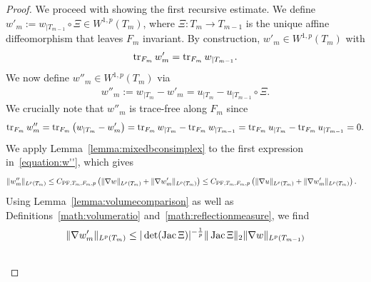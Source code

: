 \documentclass[10pt,letterpaper]{article}
\begin{document}
\begin{proof}
    We proceed with showing the first recursive estimate. 
    We define $w'_{m} := w_{|T_{m-1}} \circ \Xi \in W^{1,p}(T_{m})$,
    where $\Xi : T_{m} \rightarrow T_{m-1}$ is the unique affine diffeomorphism that leaves $F_{m}$ invariant. 
    By construction, $w'_{m} \in W^{1,p}(T_{m})$ with 
    \begin{align*}
        \operatorname{tr}_{F_{m}} w'_{m} = \operatorname{tr}_{F_{m}} w_{|T_{m-1}}
        .
    \end{align*}
    We now define $w''_{m} \in W^{1,p}(T_{m})$ via 
    \begin{align}\label{equation:w''}
        w''_{m} 
        := 
        w_{|T_{m}} - w'_{m} = u_{|T_{m}} - u_{|T_{m-1}} \circ \Xi.
    \end{align}
    We crucially note that $w''_{m}$ is trace-free along $F_{m}$ since
    \begin{align*}
        \operatorname{tr}_{F_{m}} w''_{m} 
        = 
        \operatorname{tr}_{F_{m}} \left( 
            w_{|T_{m}} - w'_{m} 
        \right) 
        =
        \operatorname{tr}_{F_{m}} w_{|T_{m}}
        -
        \operatorname{tr}_{F_{m}} w_{|T_{m-1}}
        =
        \operatorname{tr}_{F_{m}} u_{|T_{m}}
        -
        \operatorname{tr}_{F_{m}} u_{|T_{m-1}}
        = 0.
    \end{align*}
    We apply Lemma~\ref{lemma:mixedbconsimplex} to the first expression in~\eqref{equation:w''}, which gives 
    \begin{align*}
        \| w''_{m} \|_{L^{p}(T_{m})} 
        &
        \leq 
        C_{{\rm PF},T_{m},F_{m},p} 
        \left( 
            \| \nabla w \|_{L^{p}(T_{m})} 
            + 
            \| \nabla w'_{m} \|_{L^{p}(T_{m})} 
        \right) 
        \leq 
        C_{{\rm PF},T_{m},F_{m},p} 
        \left( 
            \| \nabla u \|_{L^{p}(T_{m})} 
            + 
            \| \nabla w'_{m} \|_{L^{p}(T_{m})} 
        \right) 
        .
    \end{align*}
    Using Lemma~\ref{lemma:volumecomparison} as well as Definitions~\eqref{math:volumeratio} and~\eqref{math:reflectionmeasure}, we find 
    \begin{align*}
        \| \nabla w'_{m} \|_{L^{p}(T_{m})}
        &
        \leq 
        |\det(\Jacobian \Xi  )|^{-\frac 1 p} 
        \matnorm{ \Jacobian \Xi }
        \| \nabla w \|_{L^{p}(T_{m-1})}
        \\&

\end{align*}
\end{proof}
\end{document}
